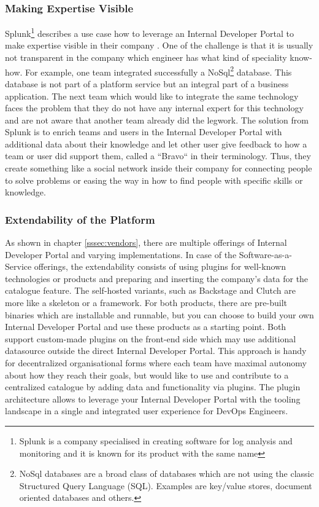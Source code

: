 \documentclass[a4paper,12pt]{article}
\begin{document}
    \subsubsection{Making Expertise Visible}
    \label{sssec:expertise}
    Splunk\footnote{Splunk is a company specialised in creating software for log analysis and monitoring and it is known
    for its product with the same name}
    describes a use case how to leverage an Internal Developer Portal to make expertise visible in their
    company\parencite{splunkidp} .
    One of the challenge is that it is usually not transparent in the company which engineer has what kind of speciality know-how.
    For example, one team integrated successfully a NoSql\footnote{NoSql databases are a broad class of databases which
    are not using the classic Structured Query Language (SQL). Examples are key/value stores, document oriented
    databases and others.  } database.
    This database is not part of a platform service but an integral part of a business application.
    The next team which would like to integrate the same technology faces the problem that they do not have any internal
    expert for this technology and are not aware that another team already did the legwork.
    The solution from Splunk is to enrich teams and users in the Internal Developer Portal with additional data about
    their knowledge and let other user give feedback to how a team or user did support them, called a ``Bravo`` in their terminology.
    Thus, they create something like a social network inside their company for connecting people to solve problems or
    easing the way in how to find people with specific skills or knowledge.

    \subsubsection{Extendability of the Platform}
    \label{sssec:extendability}
    As shown in chapter \ref{sssec:vendors}, there are multiple offerings of Internal Developer Portal and varying
    implementations.
    In case of the Software-as-a-Service offerings, the extendability consists of using plugins for well-known
    technologies or products and preparing and inserting the company's data for the catalogue feature.
    The self-hosted variants, such as Backstage and Clutch are more like a skeleton or a framework.
    For both products, there are pre-built binaries which are installable and runnable, but you can choose to build your
    own Internal Developer Portal and use these products as a starting point.
    Both support custom-made plugins on the front-end side which may use additional datasource outside the direct
    Internal Developer Portal.
    This approach is handy for decentralized organisational forms where each team have maximal autonomy about how they
    reach their goals, but would like to use and contribute to a centralized catalogue by adding data and functionality
    via plugins.
    The plugin architecture allows to leverage your Internal Developer Portal with the tooling landscape in a
    single and integrated user experience for DevOps Engineers.
\end{document}
